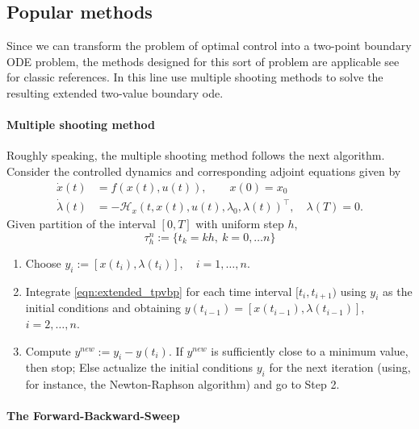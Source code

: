 \subsection{Popular methods}
  Since we can transform the problem of optimal control into a two-point 
boundary ODE problem, the methods designed for this sort of problem are 
applicable see \cite{Keller1976, Ascher1987} for classic references. In this 
line \cite{Caetano2001,Yan2008} use multiple shooting methods to solve the 
resulting extended two-value boundary ode.
\paragraph{Multiple shooting method}
  Roughly speaking, the multiple shooting method follows the next algorithm.
  Consider the controlled dynamics and corresponding adjoint equations given by
  \begin{equation}
    \label{eqn:extended_tpvbp}
    \begin{aligned}
      \dot{x}(t) &= 
        f(x(t), u(t)), \qquad x(0)=x_0 \\
      \dot{\lambda}(t) &=
        -\mathcal{H}_x(t,x(t),u(t),\lambda_0,\lambda(t))^\top, \quad 
        \lambda(T)=0.
    \end{aligned}
  \end{equation}
   Given  partition of the interval $[0, T]$ with uniform step $h$,
   $$
    \tau_h^n:= \{t_k = kh, \ k=0,\dots n\}
   $$
  \begin{enumerate}[Step 1]
    \item
      Choose $y_i := [x(t_i ), \lambda(t_i )], \quad i = 1,\dots, n$. 
    \item 
      Integrate \eqref{eqn:extended_tpvbp} for each time interval $[t_i , 
      t_{i+1})$ 
      using $y_i$ as the initial conditions and
      obtaining $y(t_{i−1}) = [x(t_{i−1}), \lambda(t_{i−1})]$, 
      $i=2, \dots, n$.
    \item
      Compute $y^{new}:= y_i − y(t_i )$.  
      If $y^{new}$ is sufficiently close to a minimum value, then stop; 
      Else actualize the initial conditions $y_i$ 
      for the next iteration (using, for instance, the Newton-Raphson 
      algorithm) and go to  Step 2.   
\end{enumerate}  
   
  
    


\paragraph{The Forward-Backward-Sweep}
	\cite{hackbusch1978numerical}

